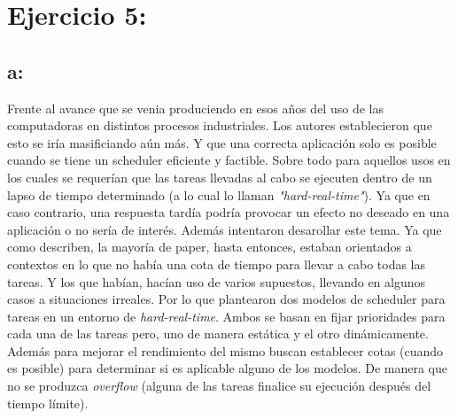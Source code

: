 \documentclass[a4paper]{article}
\begin{document}
\section{Ejercicio 5:}

\subsection{a:}

Frente al avance que se venia produciendo en esos años del uso de las computadoras en distintos procesos industriales. Los autores establecieron que esto se iría masificiando aún más. Y que una correcta aplicación solo es posible cuando se tiene un scheduler eficiente y factible. Sobre todo para aquellos usos en los cuales se requerían que las tareas llevadas al cabo se ejecuten dentro de un lapso de tiempo determinado (a lo cual lo llaman \textit{"hard-real-time"}). Ya que en caso contrario, una respuesta tardía podría provocar un efecto no deseado en una aplicación o no sería de interés. Además intentaron desarollar este tema. Ya que como describen, la mayoría de paper, hasta entonces, estaban orientados a contextos en lo que no había una cota de tiempo para llevar a cabo todas las tareas. Y los que habían, hacían uso de varios supuestos, llevando en algunos casos a situaciones irreales. Por lo que plantearon dos modelos de scheduler para tareas en un entorno de \textit{hard-real-time}. Ambos se basan en fijar prioridades para cada una de las tareas pero, uno de manera estática y el otro dinámicamente. Además para mejorar el rendimiento del mismo buscan establecer cotas (cuando es posible) para determinar si es aplicable alguno de los modelos. De manera que no se produzca \textit{overflow} (alguna de las tareas finalice su ejecución después del tiempo límite).
\end{document}
